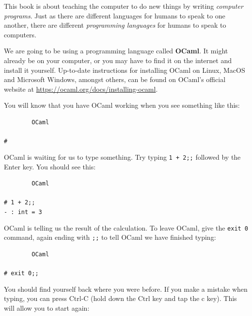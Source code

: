 \documentclass[]{book}
\newcommand{\smspace}{\vspace{4mm}}
\begin{document}
This book is about teaching the computer to do new things by writing \textit{computer programs}. Just as there are different languages for humans to speak to one another, there are different \textit{programming languages} for humans to speak to computers.

We are going to be using a programming language called \textbf{OCaml}. It might already be on your computer, or you may have to find it on the internet and install it yourself. Up-to-date instructions for installing OCaml on Linux, MacOS and Microsoft Windows, amongst others, can be found on OCaml's official website at \url{https://ocaml.org/docs/installing-ocaml}.

You will know that you have OCaml working when you see something like this:

\smspace
\noindent\verb!        OCaml!\\
\noindent\\
\noindent\verb!#!
\smspace


{\setlength\fboxsep{1.75pt}%

\noindent OCaml is waiting for us to type something. Try typing \texttt{1 + 2;;} followed by the Enter key. You should see this:

}

\smspace
\noindent\verb!        OCaml!\\
\noindent\\
\noindent\verb!# 1 + 2;;!\\
\noindent\verb!- : int = 3!
\smspace

\noindent OCaml is telling us the result of the calculation. To leave OCaml, give the \texttt{exit 0} command, again ending with \verb!;;! to tell OCaml we have finished typing:

\smspace
\noindent\verb!        OCaml!\\
\noindent\\
\noindent\verb!# exit 0;;!
\smspace

{\setlength\fboxsep{1.75pt}%

\noindent You should find yourself back where you were before. If you make a mistake when typing, you can press Ctrl-C (hold down the Ctrl key and tap the c key). This will allow you to start again:

}
\end{document}
